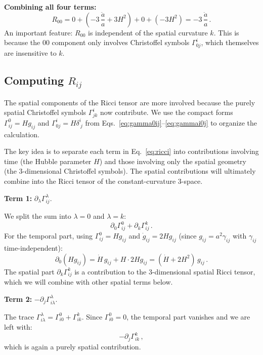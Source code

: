 \medskip\noindent\textbf{Combining all four terms:}
\begin{equation}
\boxed{R_{00} = 0 + \left(-3\,\frac{\ddot{a}}{a} + 3H^2\right) + 0 + \left(-3H^2\right) = -3\,\frac{\ddot{a}}{a}\,.}
\end{equation}
An important feature: $R_{00}$ is independent of the spatial curvature $k$. This is because the $00$ component only involves Christoffel symbols $\Gamma^i_{0j}$, which themselves are insensitive to $k$.

\subsection*{Computing $R_{ij}$}

The spatial components of the Ricci tensor are more involved because the purely spatial Christoffel symbols $\Gamma^i_{jk}$ now contribute. We use the compact forms $\Gamma^0_{ij}=Hg_{ij}$ and $\Gamma^i_{0j}=H\delta^i_{\ j}$ from Eqs.~\eqref{eq:gamma0ij}--\eqref{eq:gammai0j} to organize the calculation.

The key idea is to separate each term in Eq.~\eqref{eq:ricci} into contributions involving time (the Hubble parameter $H$) and those involving only the spatial geometry (the 3-dimensional Christoffel symbols). The spatial contributions will ultimately combine into the Ricci tensor of the constant-curvature 3-space.

\medskip\noindent\textbf{Term 1:} $\partial_\lambda\Gamma^\lambda_{ij}$.

We split the sum into $\lambda=0$ and $\lambda=k$:
\begin{equation}
    \partial_0\Gamma^0_{ij} + \partial_k\Gamma^k_{ij}\,.
\end{equation}
For the temporal part, using $\Gamma^0_{ij}=Hg_{ij}$ and $\dot{g}_{ij}=2Hg_{ij}$ (since $g_{ij}=a^2\gamma_{ij}$ with $\gamma_{ij}$ time-independent):
\begin{equation}
    \partial_0(Hg_{ij}) = \dot{H}\,g_{ij} + H\cdot 2Hg_{ij} = (\dot{H}+2H^2)\,g_{ij}\,.
\end{equation}
The spatial part $\partial_k\Gamma^k_{ij}$ is a contribution to the 3-dimensional spatial Ricci tensor, which we will combine with other spatial terms below.

\medskip\noindent\textbf{Term 2:} $-\partial_j\Gamma^\lambda_{i\lambda}$.

The trace $\Gamma^\lambda_{i\lambda}=\Gamma^0_{i0}+\Gamma^k_{ik}$. Since $\Gamma^0_{i0}=0$, the temporal part vanishes and we are left with:
\begin{equation}
    -\partial_j\Gamma^k_{ik}\,,
\end{equation}
which is again a purely spatial contribution.

